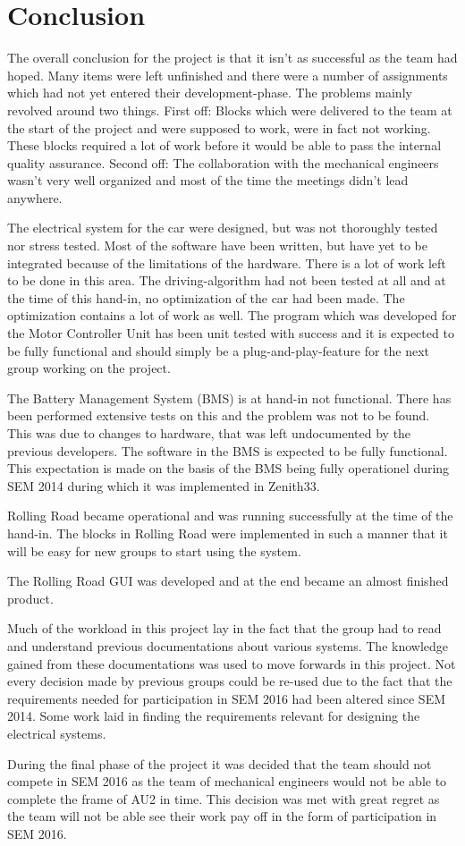 \chapter{Conclusion}
The overall conclusion for the project is that it isn't as successful as the team had hoped. Many items were left unfinished and there were a number of assignments which had not yet entered their development-phase. The problems mainly revolved around two things. First off: Blocks which were delivered to the team at the start of the project and were supposed to work, were in fact not working. These blocks required a lot of work before it would be able to pass the internal quality assurance. Second off: The collaboration with the mechanical engineers wasn't very well organized and most of the time the meetings didn't lead anywhere.   

The electrical system for the car were designed, but was not thoroughly tested nor stress tested. Most of the software have been written, but have yet to be integrated because of the limitations of the hardware. There is a lot of work left to be done in this area. The driving-algorithm had not been tested at all and at the time of this hand-in, no optimization of the car had been made. The optimization contains a lot of work as well. The program which was developed for the Motor Controller Unit has been unit tested with success and it is expected to be fully functional and should simply be a plug-and-play-feature for the next group working on the project. 

The Battery Management System (BMS) is at hand-in not functional. There has been performed extensive tests on this and the problem was not to be found. This was due to changes to hardware, that was left undocumented by the previous developers. The software in the BMS is expected to be fully functional. This expectation is made on the basis of the BMS being fully operationel during SEM 2014 during which it was implemented in Zenith33.

Rolling Road became operational and was running successfully at the time of the hand-in. The blocks in Rolling Road were implemented in such a manner that it will be easy for new groups to start using the system. 

The Rolling Road GUI was developed and at the end became an almost finished product.

Much of the workload in this project lay in the fact that the group had to read and understand previous documentations about various systems. The knowledge gained from these documentations was used to move forwards in this project. Not every decision made by previous groups could be re-used due to the fact that the requirements needed for participation in SEM 2016 had been altered since SEM 2014. Some work laid in finding the requirements relevant for designing the electrical systems.

During the final phase of the project it was decided that the team should not compete in SEM 2016 as the team of mechanical engineers would not be able to complete the frame of AU2 in time. This decision was met with great regret as the team will not be able see their work pay off in the form of participation in SEM 2016.